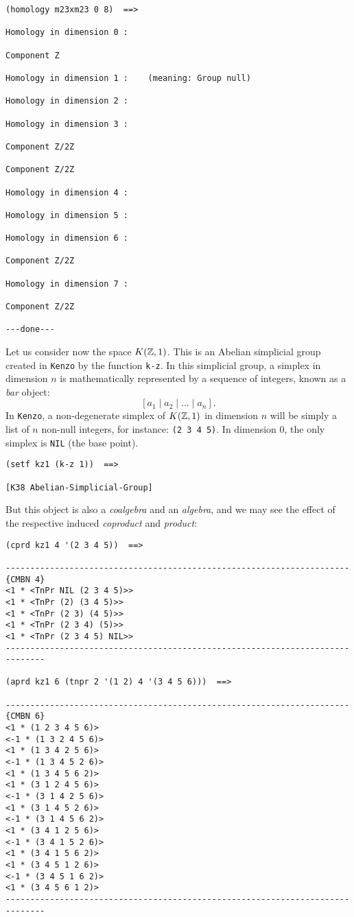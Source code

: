 {\footnotesize\begin{verbatim}
(homology m23xm23 0 8)  ==>

Homology in dimension 0 :

Component Z

Homology in dimension 1 :    (meaning: Group null)

Homology in dimension 2 :

Homology in dimension 3 :

Component Z/2Z

Component Z/2Z

Homology in dimension 4 :

Homology in dimension 5 :

Homology in dimension 6 :

Component Z/2Z

Homology in dimension 7 :

Component Z/2Z

---done---
\end{verbatim}}
\newpage
Let us consider now the space $K({{\Bbb Z}}, 1)$. This is an Abelian simplicial group created  in {\tt Kenzo} 
by the function {\tt k-z}.
In this simplicial group, a  simplex  in dimension $n$ 
is mathematically represented by a sequence of integers, known as a {\em bar} object:
$$ [a_1 \mid a_2 \mid \ldots \mid a_n]. $$
In {\tt Kenzo}, a non-degenerate simplex of $K({{\Bbb Z}},1)$ in dimension $n$ will be simply 
a list of $n$ non-null integers, for instance: {\tt (2 3 4 5)}. In dimension $0$, the only
simplex is {\tt NIL} (the base point).
{\footnotesize\begin{verbatim}
(setf kz1 (k-z 1))  ==>

[K38 Abelian-Simplicial-Group]
\end{verbatim}}
But this object is also a {\em coalgebra} and an {\em algebra}, and we may
see the effect of the respective induced {\em coproduct} and {\em product}:
{\footnotesize\begin{verbatim}
(cprd kz1 4 '(2 3 4 5))  ==>

----------------------------------------------------------------------{CMBN 4}
<1 * <TnPr NIL (2 3 4 5)>>
<1 * <TnPr (2) (3 4 5)>>
<1 * <TnPr (2 3) (4 5)>>
<1 * <TnPr (2 3 4) (5)>>
<1 * <TnPr (2 3 4 5) NIL>>
------------------------------------------------------------------------------

(aprd kz1 6 (tnpr 2 '(1 2) 4 '(3 4 5 6)))  ==>

----------------------------------------------------------------------{CMBN 6}
<1 * (1 2 3 4 5 6)>
<-1 * (1 3 2 4 5 6)>
<1 * (1 3 4 2 5 6)>
<-1 * (1 3 4 5 2 6)>
<1 * (1 3 4 5 6 2)>
<1 * (3 1 2 4 5 6)>
<-1 * (3 1 4 2 5 6)>
<1 * (3 1 4 5 2 6)>
<-1 * (3 1 4 5 6 2)>
<1 * (3 4 1 2 5 6)>
<-1 * (3 4 1 5 2 6)>
<1 * (3 4 1 5 6 2)>
<1 * (3 4 5 1 2 6)>
<-1 * (3 4 5 1 6 2)>
<1 * (3 4 5 6 1 2)>
------------------------------------------------------------------------------
\end{verbatim}}
